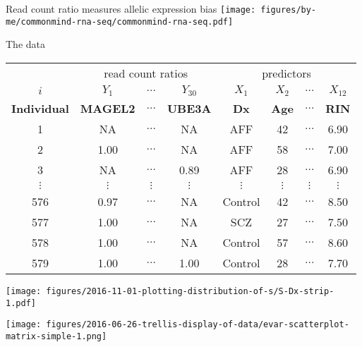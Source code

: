 \documentclass{beamer} %
\begin{document}
\begin{frame}{Read count ratio measures allelic expression bias}
\texttt{[image: figures/by-me/commonmind-rna-seq/commonmind-rna-seq.pdf]}
\end{frame}

\begin{frame}{The data}
\footnotesize
\begin{tabular}{|c|ccc|cccc|}
 & \multicolumn{3}{|c|}{read count ratios} & \multicolumn{4}{|c|}{predictors} \\
\(i\) & \(Y_1\) & \(\hdots\) & \(Y_{30}\) & \(X_1\) & \(X_2\) & \(\hdots\) & \(X_{12}\) \\
\textbf{Individual} & \textbf{MAGEL2} & \(\hdots\) & \textbf{UBE3A} & \textbf{Dx} & \textbf{Age} & \(\hdots\) & \textbf{RIN} \\
\hline
1 & NA & \(\hdots\) & NA & AFF & 42 & \(\hdots\) & 6.90 \\
2 & 1.00 & \(\hdots\) & NA & AFF & 58 & \(\hdots\) & 7.00 \\
3 & NA & \(\hdots\) & 0.89 & AFF & 28 & \(\hdots\) & 6.90 \\
\(\vdots\) & \(\vdots\) & \(\vdots\) & \(\vdots\) & \(\vdots\) & \(\vdots\) & \(\vdots\) & \(\vdots\) \\
576 & 0.97 & \(\hdots\) & NA & Control & 42 & \(\hdots\) & 8.50 \\
577 & 1.00 & \(\hdots\) & NA & SCZ & 27 & \(\hdots\) & 7.50 \\
578 & 1.00 & \(\hdots\) & NA & Control & 57 & \(\hdots\) & 8.60 \\
579 & 1.00 & \(\hdots\) & 1.00 & Control & 28 & \(\hdots\) & 7.70 \\
\end{tabular}
\end{frame}

\begin{frame}[plain]
\begin{center}
\texttt{[image: figures/2016-11-01-plotting-distribution-of-s/S-Dx-strip-1.pdf]}
\end{center}
\end{frame}

\begin{frame}[plain]
\begin{center}
\texttt{[image: figures/2016-06-26-trellis-display-of-data/evar-scatterplot-matrix-simple-1.png]}
\end{center}
\end{frame}
\end{document}

